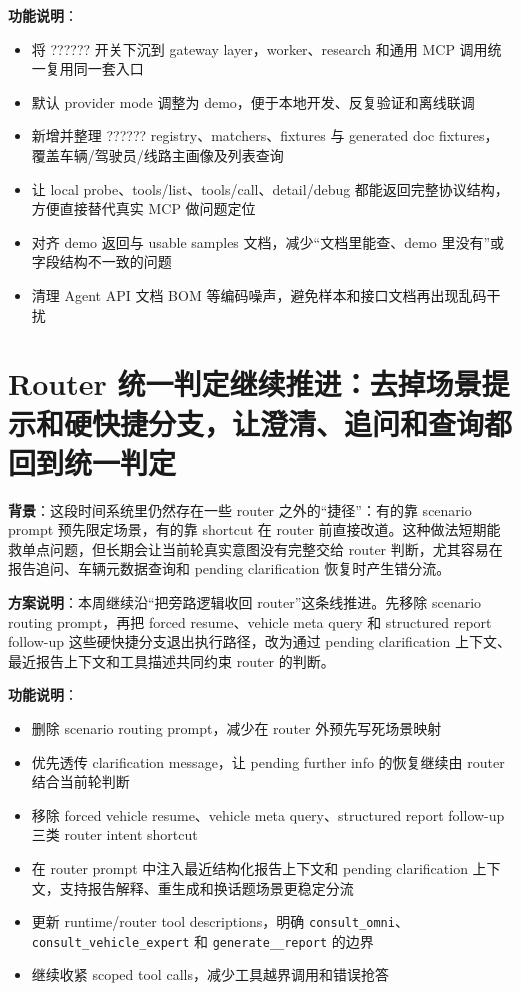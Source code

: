 \documentclass[UTF8]{ctexart}
\begin{document}
\textbf{功能说明}：
\begin{itemize}
\item 将 ?????? 开关下沉到 gateway layer，worker、research 和通用 MCP 调用统一复用同一套入口
\item 默认 provider mode 调整为 demo，便于本地开发、反复验证和离线联调
\item 新增并整理 ?????? registry、matchers、fixtures 与 generated doc fixtures，覆盖车辆/驾驶员/线路主画像及列表查询
\item 让 local probe、tools/list、tools/call、detail/debug 都能返回完整协议结构，方便直接替代真实 MCP 做问题定位
\item 对齐 demo 返回与 usable samples 文档，减少“文档里能查、demo 里没有”或字段结构不一致的问题
\item 清理 Agent API 文档 BOM 等编码噪声，避免样本和接口文档再出现乱码干扰
\end{itemize}

\section{Router 统一判定继续推进：去掉场景提示和硬快捷分支，让澄清、追问和查询都回到统一判定}

\textbf{背景}：这段时间系统里仍然存在一些 router 之外的“捷径”：有的靠 scenario prompt 预先限定场景，有的靠 shortcut 在 router 前直接改道。这种做法短期能救单点问题，但长期会让当前轮真实意图没有完整交给 router 判断，尤其容易在报告追问、车辆元数据查询和 pending clarification 恢复时产生错分流。

\textbf{方案说明}：本周继续沿“把旁路逻辑收回 router”这条线推进。先移除 scenario routing prompt，再把 forced resume、vehicle meta query 和 structured report follow-up 这些硬快捷分支退出执行路径，改为通过 pending clarification 上下文、最近报告上下文和工具描述共同约束 router 的判断。

\textbf{功能说明}：
\begin{itemize}
\item 删除 scenario routing prompt，减少在 router 外预先写死场景映射
\item 优先透传 clarification message，让 pending further info 的恢复继续由 router 结合当前轮判断
\item 移除 forced vehicle resume、vehicle meta query、structured report follow-up 三类 router intent shortcut
\item 在 router prompt 中注入最近结构化报告上下文和 pending clarification 上下文，支持报告解释、重生成和换话题场景更稳定分流
\item 更新 runtime/router tool descriptions，明确 \texttt{consult\_omni}、\texttt{consult\_vehicle\_expert} 和 \texttt{generate\_\*\_report} 的边界
\item 继续收紧 scoped tool calls，减少工具越界调用和错误抢答
\end{itemize}
\end{document}
